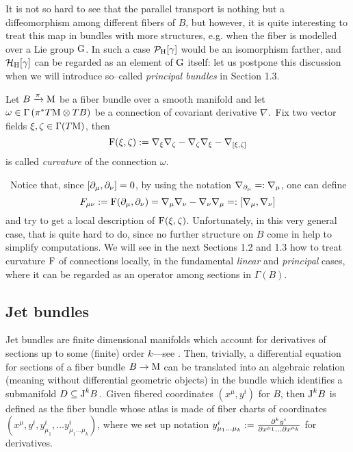 It is not so hard to see that the parallel transport is nothing but a diffeomorphism among different fibers of $B$, but however, it is quite interesting to treat this map in bundles with more structures, e.g. when the fiber is modelled over a Lie group $\text{\normalfont G}$. In such a case $\mathcal{P}_{\text{\normalfont H}}[\gamma]$ would be an isomorphism farther, and $\mathcal{H}_{\text{\normalfont H}}[\gamma]$ can be regarded as an element of $\text{\normalfont G}$ itself: let us postpone this discussion when we will introduce so--called \emph{principal bundles} in Section 1.3.

\begin{defi}\label{curvature_gen_def}
    Let $B\xrightarrow{\pi}\text{\normalfont M}$ be a fiber bundle over a smooth manifold and let $\omega\in\Gamma\left(\pi^*T\text{\normalfont M}\otimes TB\right)$ be a connection of covariant derivative $\nabla$.\, %
    Fix two vector fields $\xi,\zeta\in\Gamma(T\text{\normalfont M})$, then 
    $$\text{\normalfont F}(\xi,\zeta):=\nabla_\xi\nabla_\zeta-\nabla_\zeta\nabla_\xi-\nabla_{[\xi,\zeta]}$$
    is called \emph{curvature} of the connection $\omega$.
\end{defi}
\,\newline
Notice that, since $[\partial_\mu,\partial_\nu]=0$, by using the notation $\nabla_{\partial_\mu}=:\nabla_\mu$, one can define 
$$F_{\mu\nu}:=\text{\normalfont F}(\partial_\mu,\partial_\nu)=\nabla_\mu\nabla_\nu-\nabla_\nu\nabla_\mu=:[\nabla_\mu,\nabla_\nu]$$
and try to get a local description of $\text{\normalfont F}(\xi,\zeta)$. Unfortunately, in this very general case, that is quite hard to do, since no further structure on $B$ come in help to simplify computations. We will see in the next Sections 1.2 and 1.3 how to treat curvature $\text{\normalfont F}$ of connections locally, in the fundamental \emph{linear} and \emph{principal} cases, where it can be regarded as an operator among sections in $\Gamma(B)$.


\subsection{Jet bundles}\label{jet}

Jet bundles are finite dimensional manifolds which account for derivatives of sections up to some (finite) order $k$---see \cite{jetBundles}. Then, trivially, a differential equation for sections of a fiber bundle $B\to\text{\normalfont M}$ can be translated into an algebraic relation (meaning without differential geometric objects) in the bundle which identifies a submanifold $D\subseteq\text{\normalfont J}^kB$.\, Given fibered coordinates $(x^\mu,y^i)$ for $B$, then $\text{\normalfont J}^kB$ is defined as the fiber bundle whose atlas is made of fiber charts of coordinates $\left(x^\mu,y^i,y^i_{\mu_1},\hdots y^i_{\mu_1\hdots\mu_k}\right)$, where we set up notation $y^i_{\mu_1\hdots\mu_k}:=\frac{\partial^k y^i}{\partial x^{\mu_1}\hdots\partial x^{\mu_k}}$ for derivatives. %

